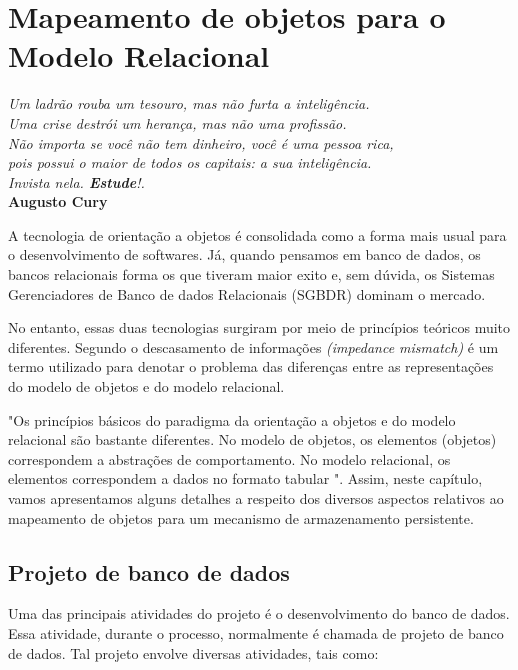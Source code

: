 \chapter{Mapeamento de objetos para o Modelo Relacional}\label{cap:cap1}

\begin{flushright}
	\textit{
		Um ladrão rouba um tesouro, mas não furta a inteligência. \\
		Uma crise destrói um herança, mas não uma profissão. \\ Não importa se você não tem dinheiro, você é uma pessoa rica, \\ pois possui o maior de todos os capitais: a sua inteligência. \\ Invista nela. \textbf{Estude}!.
	} \\
	
	\textbf{Augusto Cury}
\end{flushright}

A tecnologia de orientação a objetos é consolidada como a forma mais usual para o desenvolvimento de softwares. Já, quando pensamos em banco de dados, os bancos relacionais forma os que tiveram maior exito e, sem dúvida, os Sistemas Gerenciadores de Banco de dados Relacionais (SGBDR) dominam o mercado. 

No entanto, essas duas tecnologias surgiram por meio de princípios teóricos muito diferentes. Segundo  o descasamento de informações \textit{(impedance mismatch)} é um termo utilizado para denotar o problema das diferenças entre as representações do modelo de objetos e do modelo relacional.

"Os princípios básicos do paradigma da orientação a objetos e do modelo relacional são bastante diferentes. No modelo de objetos, os elementos (objetos) correspondem a abstrações de comportamento. No modelo relacional, os elementos correspondem a dados no formato tabular \cite{bezerra2016principios}". Assim, neste capítulo, vamos apresentamos alguns detalhes a respeito dos diversos aspectos relativos ao mapeamento de objetos para um mecanismo de armazenamento persistente.

\section{Projeto de banco de dados}

Uma das principais atividades do projeto é o desenvolvimento do banco de dados. Essa atividade, durante o processo, normalmente é chamada de projeto de banco de dados. Tal projeto envolve diversas atividades, tais como:

